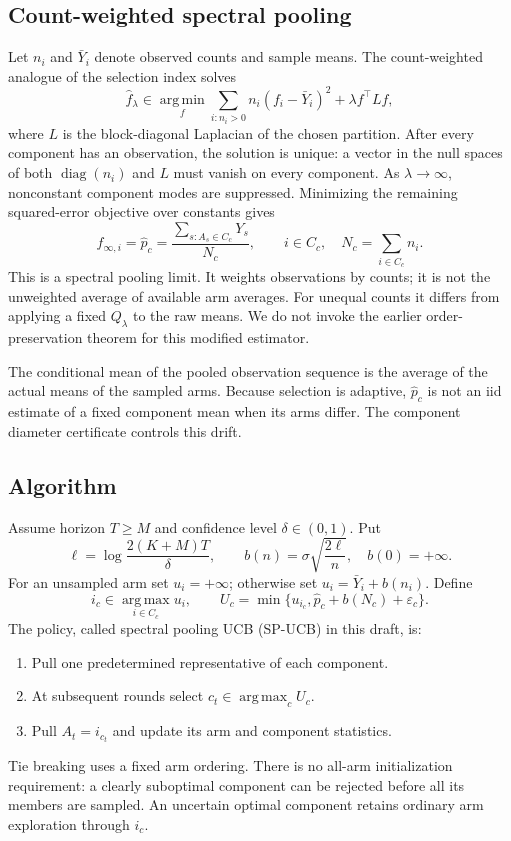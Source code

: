 \documentclass[11pt]{article}
\newcommand{\diag}{\operatorname{diag}}
\newcommand{\argmax}{\operatorname*{arg\,max}}
\newcommand{\argmin}{\operatorname*{arg\,min}}
\begin{document}
\subsection{Count-weighted spectral pooling}
Let $n_i$ and $\bar Y_i$ denote observed counts and sample means. The count-weighted analogue of the selection index solves
\begin{equation}
 \widehat f_\lambda\in\argmin_f
       \sum_{i:n_i>0}n_i(f_i-\bar Y_i)^2+\lambda f^\top Lf,
 \label{eq:weighted}
\end{equation}
where $L$ is the block-diagonal Laplacian of the chosen partition. After every component has an observation, the solution is unique: a vector in the null spaces of both $\diag(n_i)$ and $L$ must vanish on every component. As $\lambda\to\infty$, nonconstant component modes are suppressed. Minimizing the remaining squared-error objective over constants gives
\begin{equation}
 \widehat f_{\infty,i}=\widehat p_c
 =\frac{\sum_{s:A_s\in C_c}Y_s}{N_c},\qquad i\in C_c,
 \quad N_c=\sum_{i\in C_c}n_i.
 \label{eq:pool}
\end{equation}
This is a spectral pooling limit. It weights observations by counts; it is not the unweighted average of available arm averages. For unequal counts it differs from applying a fixed $Q_\lambda$ to the raw means. We do not invoke the earlier order-preservation theorem for this modified estimator.

The conditional mean of the pooled observation sequence is the average of the actual means of the sampled arms. Because selection is adaptive, $\widehat p_c$ is not an iid estimate of a fixed component mean when its arms differ. The component diameter certificate controls this drift.

\subsection{Algorithm}
Assume horizon $T\ge M$ and confidence level $\delta\in(0,1)$. Put
\begin{equation}
 \ell=\log\frac{2(K+M)T}{\delta},\qquad
 b(n)=\sigma\sqrt{\frac{2\ell}{n}},\quad b(0)=+\infty.
 \label{eq:radius}
\end{equation}
For an unsampled arm set $u_i=+\infty$; otherwise set
$u_i=\bar Y_i+b(n_i)$. Define
\begin{equation}
 i_c\in\argmax_{i\in C_c}u_i,\qquad
 U_c=\min\{u_{i_c},\widehat p_c+b(N_c)+\varepsilon_c\}.
 \label{eq:index}
\end{equation}
The policy, called spectral pooling UCB (SP-UCB) in this draft, is:
\begin{enumerate}
 \item Pull one predetermined representative of each component.
 \item At subsequent rounds select $c_t\in\argmax_c U_c$.
 \item Pull $A_t=i_{c_t}$ and update its arm and component statistics.
\end{enumerate}
Tie breaking uses a fixed arm ordering. There is no all-arm initialization requirement: a clearly suboptimal component can be rejected before all its members are sampled. An uncertain optimal component retains ordinary arm exploration through $i_c$.
\end{document}
